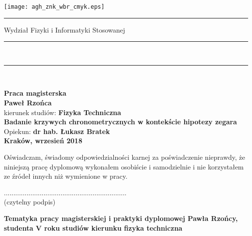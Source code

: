 {%
\pagestyle{empty}
\texttt{[image: agh\_znk\_wbr\_cmyk.eps]}\\
\rule{30mm}{0pt}
{\large\textsf{Wydział Fizyki i Informatyki Stosowanej}}\\
\rule{\textwidth}{3pt}\\
\rule[2ex]
{\textwidth}{1pt}\\
\vspace{7ex}
\begin{center}
{\bf\LARGE\textsf{Praca magisterska}}\\
\vspace{13ex}
{\bf\Large\textsf{Paweł Rzońca}}\\
\vspace{3ex}
{\sf \small kierunek studiów:} {\bf\small\textsf{Fizyka Techniczna}}\\
\vspace{15ex}
{\bf\huge\textsf{Badanie krzywych chronometrycznych w kontekście hipotezy zegara}}\\
\vspace{14ex}
{\sf \Large Opiekun:} {\bf\Large\textsf{dr hab. Łukasz Bratek}}\\
\vspace{22ex}
\textsf{\bf\large\textsf{Kraków, wrzesień 2018}}
\end{center}
\newpage
{\sf Oświadczam, świadomy odpowiedzialności karnej za poświadczenie nieprawdy,
że niniejszą pracę dyplomową wykonałem osobiście i samodzielnie i nie korzystałem
ze źródeł innych niż wymienione w pracy.}

\vspace{14ex}

\begin{flushright}
................................................................. \\
{\sf (czytelny podpis)}
\end{flushright}
\newpage

\newpage
{}
\begin{center}
{\bf Tematyka pracy magisterskiej i praktyki dyplomowej
Pawła Rzońcy,
studenta V roku studiów kierunku fizyka techniczna}\\
\end{center}

}
